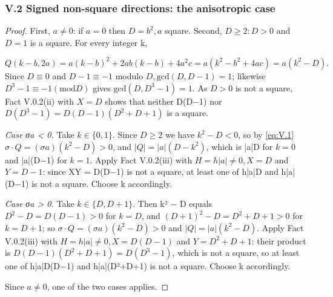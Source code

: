 \subsubsection*{V.2 Signed non-square directions: the anisotropic case}
\begin{proof}
First, $a ≠ 0$: if $a = 0$ then $D = b^{2}, a$ square. Second, $D ≥ 2: D > 0$ and $D = 1$ is a square. For every integer k,

\begin{equation}\tag{V.1}\label{eq:V.1}
Q(k − b, 2a) = a(k−b)^{2} + 2ab(k−b) + 4a^{2}c = a(k^{2} − b^{2} + 4ac) = a(k^{2} − D).
\end{equation}
Since $D ≡ 0$ and $D − 1 ≡ −1$ modulo $D, \mathrm{gcd}(D, D−1) = 1$; likewise $D^{3} − 1 ≡ −1 (\mathrm{mod} D)$ gives $\mathrm{gcd}(D, D^{3}−1) = 1$. As $D > 0$ is not a square, Fact V.0.2(ii) with $X = D$ shows that neither D(D−1) nor $D(D^{3}−1) = D(D−1)(D^{2}+D+1)$ is a square.

\emph{Case σa < 0.} Take $k ∈ \{0, 1\}$. Since $D ≥ 2$ we have $k^{2} − D < 0$, so by \eqref{eq:V.1} $σ·Q = (σa)(k^{2} − D) > 0$, and $|Q| = |a|(D − k^{2})$, which is |a|D for $k = 0$ and |a|(D−1) for $k = 1$. Apply Fact V.0.2(iii) with $H = h|a| ≠ 0, X = D$ and $Y = D − 1$: since XY = D(D−1) is not a square, at least one of h|a|D and h|a|(D−1) is not a square. Choose k accordingly.

\emph{Case σa > 0.} Take $k ∈ \{D, D+1\}$. Then k² − D equals $D^{2} − D = D(D−1) > 0$ for $k = D$, and $(D+1)^{2} − D = D^{2} + D + 1 > 0$ for $k = D+1$; so $σ·Q = (σa)(k^{2} − D) > 0$ and $|Q| = |a|(k^{2} − D)$. Apply Fact V.0.2(iii) with $H = h|a| ≠ 0, X = D(D−1)$ and $Y = D^{2} + D + 1$: their product is $D(D−1)(D^{2}+D+1) = D(D^{3}−1)$, which is not a square, so at least one of h|a|D(D−1) and h|a|(D²+D+1) is not a square. Choose k accordingly.

Since $a ≠ 0$, one of the two cases applies.

\end{proof}

